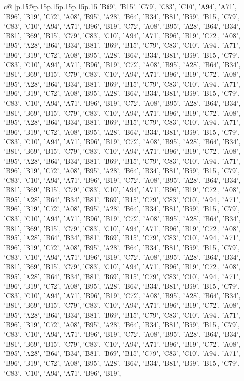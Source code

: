 \documentclass{article}
\begin{document}
{\begin{supertabular}{c@{$\;$}|p{.15\linewidth}@{}p{.15\linewidth}p{.15\linewidth}p{.15\linewidth}p{.15\linewidth}p{.15\linewidth}}
{{{{{'B69', 'B15', 'C79', 'C83', 'C10', 'A94', 'A71', 'B96', 'B19', 'C72', 'A08', 'B95', 'A28', 'B64', 'B34', 'B81', 'B69', 'B15', 'C79', 'C83', 'C10', 'A94', 'A71', 'B96', 'B19', 'C72', 'A08', 'B95', 'A28', 'B64', 'B34', 'B81', 'B69', 'B15', 'C79', 'C83', 'C10', 'A94', 'A71', 'B96', 'B19', 'C72', 'A08', 'B95', 'A28', 'B64', 'B34', 'B81', 'B69', 'B15', 'C79', 'C83', 'C10', 'A94', 'A71', 'B96', 'B19', 'C72', 'A08', 'B95', 'A28', 'B64', 'B34', 'B81', 'B69', 'B15', 'C79', 'C83', 'C10', 'A94', 'A71', 'B96', 'B19', 'C72', 'A08', 'B95', 'A28', 'B64', 'B34', 'B81', 'B69', 'B15', 'C79', 'C83', 'C10', 'A94', 'A71', 'B96', 'B19', 'C72', 'A08', 'B95', 'A28', 'B64', 'B34', 'B81', 'B69', 'B15', 'C79', 'C83', 'C10', 'A94', 'A71', 'B96', 'B19', 'C72', 'A08', 'B95', 'A28', 'B64', 'B34', 'B81', 'B69', 'B15', 'C79', 'C83', 'C10', 'A94', 'A71', 'B96', 'B19', 'C72', 'A08', 'B95', 'A28', 'B64', 'B34', 'B81', 'B69', 'B15', 'C79', 'C83', 'C10', 'A94', 'A71', 'B96', 'B19', 'C72', 'A08', 'B95', 'A28', 'B64', 'B34', 'B81', 'B69', 'B15', 'C79', 'C83', 'C10', 'A94', 'A71', 'B96', 'B19', 'C72', 'A08', 'B95', 'A28', 'B64', 'B34', 'B81', 'B69', 'B15', 'C79', 'C83', 'C10', 'A94', 'A71', 'B96', 'B19', 'C72', 'A08', 'B95', 'A28', 'B64', 'B34', 'B81', 'B69', 'B15', 'C79', 'C83', 'C10', 'A94', 'A71', 'B96', 'B19', 'C72', 'A08', 'B95', 'A28', 'B64', 'B34', 'B81', 'B69', 'B15', 'C79', 'C83', 'C10', 'A94', 'A71', 'B96', 'B19', 'C72', 'A08', 'B95', 'A28', 'B64', 'B34', 'B81', 'B69', 'B15', 'C79', 'C83', 'C10', 'A94', 'A71', 'B96', 'B19', 'C72', 'A08', 'B95', 'A28', 'B64', 'B34', 'B81', 'B69', 'B15', 'C79', 'C83', 'C10', 'A94', 'A71', 'B96', 'B19', 'C72', 'A08', 'B95', 'A28', 'B64', 'B34', 'B81', 'B69', 'B15', 'C79', 'C83', 'C10', 'A94', 'A71', 'B96', 'B19', 'C72', 'A08', 'B95', 'A28', 'B64', 'B34', 'B81', 'B69', 'B15', 'C79', 'C83', 'C10', 'A94', 'A71', 'B96', 'B19', 'C72', 'A08', 'B95', 'A28', 'B64', 'B34', 'B81', 'B69', 'B15', 'C79', 'C83', 'C10', 'A94', 'A71', 'B96', 'B19', 'C72', 'A08', 'B95', 'A28', 'B64', 'B34', 'B81', 'B69', 'B15', 'C79', 'C83', 'C10', 'A94', 'A71', 'B96', 'B19', 'C72', 'A08', 'B95', 'A28', 'B64', 'B34', 'B81', 'B69', 'B15', 'C79', 'C83', 'C10', 'A94', 'A71', 'B96', 'B19', 'C72', 'A08', 'B95', 'A28', 'B64', 'B34', 'B81', 'B69', 'B15', 'C79', 'C83', 'C10', 'A94', 'A71', 'B96', 'B19', 'C72', 'A08', 'B95', 'A28', 'B64', 'B34', 'B81', 'B69', 'B15', 'C79', 'C83', 'C10', 'A94', 'A71', 'B96', 'B19', 'C72', 'A08', 'B95', 'A28', 'B64', 'B34', 'B81', 'B69', 'B15', 'C79', 'C83', 'C10', 'A94', 'A71', 'B96', 'B19', 'C72', 'A08', 'B95', 'A28', 'B64', 'B34', 'B81', 'B69', 'B15', 'C79', 'C83', 'C10', 'A94', 'A71', 'B96', 'B19', 'C72', 'A08', 'B95', 'A28', 'B64', 'B34', 'B81', 'B69', 'B15', 'C79', 'C83', 'C10', 'A94', 'A71', 'B96', 'B19', 'C72', 'A08', 'B95', 'A28', 'B64', 'B34', 'B81', 'B69', 'B15', 'C79', 'C83', 'C10', 'A94', 'A71', 'B96', 'B19', 'C72', 'A08', 'B95', 'A28', 'B64', 'B34', 'B81', 'B69', 'B15', 'C79', 'C83', 'C10', 'A94', 'A71', 'B96', 'B19', 'C72', 'A08', 'B95', 'A28', 'B64', 'B34', 'B81', 'B69', 'B15', 'C79', 'C83', 'C10', 'A94', 'A71', 'B96', 'B19', 'C72', 'A08', 'B95', 'A28', 'B64', 'B34', 'B81', 'B69', 'B15', 'C79', 'C83', 'C10', 'A94', 'A71', 'B96', 'B19', }}}}}
\end{supertabular}}
\end{document}
